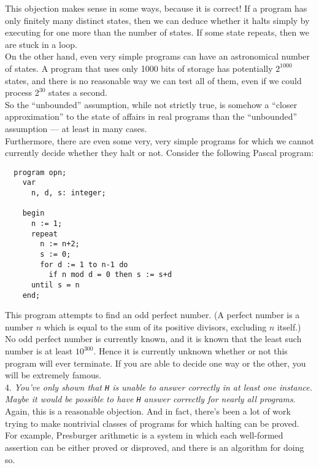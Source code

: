 \documentclass[12pt]{article}
\theoremstyle{plain}
\theoremstyle{definition}
\begin{document}
This objection makes sense in some ways, because it is correct!
If a program has only finitely many distinct states, then we can deduce whether it halts simply by executing for one more than the number of states.
If some state repeats, then we are stuck in a loop. \\

On the other hand, even very simple programs can have an astronomical number of states.
A program that uses only 1000 bits of storage has potentially $2^{1000}$ states, and there is no reasonable way we can test all of them, even if we could process $2^{30}$ states a second. \\

So the ``unbounded'' assumption, while not strictly true, is somehow a ``closer approximation'' to the state of affairs in real programs than the ``unbounded'' assumption --- at least in many cases. \\

Furthermore, there are even some very, very simple programs for which we cannot currently decide whether they halt or not.
Consider the following Pascal program:
\begin{verbatim}
  program opn;
    var
      n, d, s: integer;

    begin
      n := 1;
      repeat
        n := n+2;
        s := 0;
        for d := 1 to n-1 do
          if n mod d = 0 then s := s+d
      until s = n
    end;
\end{verbatim}
This program attempts to find an odd perfect number.
(A perfect number is a number $n$ which is equal to the sum of its positive divisors, excluding $n$ itself.)
No odd perfect number is currently known, and it is known that the least such number is at least $10^{300}$.
Hence it is currently unknown whether or not this program will ever terminate.
If you are able to decide one way or the other, you will be extremely famous. \\

4. \emph{You've only shown that \texttt{H} is unable to answer correctly in at least one instance. Maybe it would be possible to have \texttt{H} answer correctly for nearly all programs}. \\

Again, this is a reasonable objection.
And in fact, there's been a lot of work trying to make nontrivial classes of programs for which halting can be proved.
For example, Presburger arithmetic is a system in which each well-formed assertion can be either proved or disproved, and there is an algorithm for doing so. \\
\end{document}
